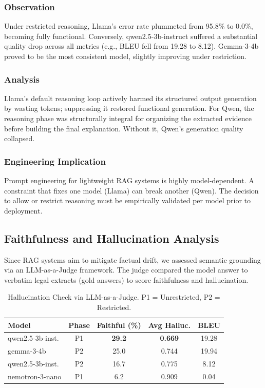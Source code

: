 \documentclass[conference]{IEEEtran}
\begin{document}
\subsubsection*{Observation}
Under restricted reasoning, Llama's error rate plummeted from 95.8\% to 0.0\%, becoming fully functional. Conversely, qwen2.5-3b-instruct suffered a substantial quality drop across all metrics (e.g., BLEU fell from 19.28 to 8.12). Gemma-3-4b proved to be the most consistent model, slightly improving under restriction.

\subsubsection*{Analysis}
Llama's default reasoning loop actively harmed its structured output generation by wasting tokens; suppressing it restored functional generation. For Qwen, the reasoning phase was structurally integral for organizing the extracted evidence before building the final explanation. Without it, Qwen's generation quality collapsed.

\subsubsection*{Engineering Implication}
Prompt engineering for lightweight RAG systems is highly model-dependent. A constraint that fixes one model (Llama) can break another (Qwen). The decision to allow or restrict reasoning must be empirically validated per model prior to deployment.

\subsection{Faithfulness and Hallucination Analysis}
\label{sec:hallucination}

Since RAG systems aim to mitigate factual drift, we assessed semantic grounding via an LLM-as-a-Judge framework. The judge compared the model answer to verbatim legal extracts (gold answers) to score faithfulness and hallucination.

\begin{table}[!t]
\centering
\caption{Hallucination Check via LLM-as-a-Judge. P1 = Unrestricted, P2 = Restricted.}
\label{tab:hallucination}
\renewcommand{\arraystretch}{1.2}
\begin{tabular}{lcccc}
\toprule
\textbf{Model} & \textbf{Phase} & \textbf{Faithful (\%)} & \textbf{Avg Halluc.} & \textbf{BLEU} \\
\midrule
qwen2.5-3b-inst. & P1 & \textbf{29.2} & \textbf{0.669} & 19.28 \\
gemma-3-4b & P2 & 25.0 & 0.744 & 19.94 \\
qwen2.5-3b-inst. & P2 & 16.7 & 0.775 & 8.12 \\
nemotron-3-nano & P1 & 6.2 & 0.909 & 0.04 \\
\bottomrule
\end{tabular}
\end{table}
\end{document}
